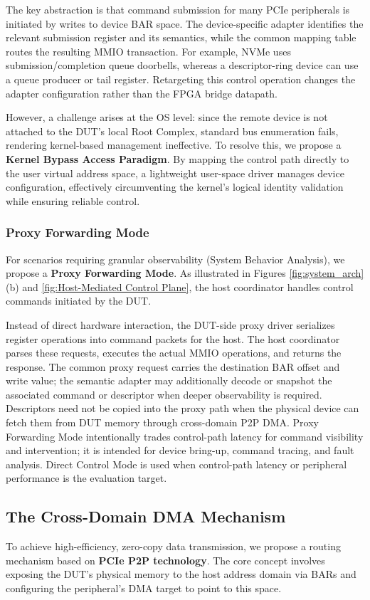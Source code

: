 \documentclass[10pt,conference,letterpaper]{IEEEtran}
\begin{document}
The key abstraction is that command submission for many PCIe peripherals is initiated by writes to device BAR space. The device-specific adapter identifies the relevant submission register and its semantics, while the common mapping table routes the resulting MMIO transaction. For example, NVMe uses submission/completion queue doorbells, whereas a descriptor-ring device can use a queue producer or tail register. Retargeting this control operation changes the adapter configuration rather than the FPGA bridge datapath.

However, a challenge arises at the OS level: since the remote device is not attached to the DUT's local Root Complex, standard bus enumeration fails, rendering kernel-based management ineffective. To resolve this, we propose a \textbf{Kernel Bypass Access Paradigm}. By mapping the control path directly to the user virtual address space, a lightweight user-space driver manages device configuration, effectively circumventing the kernel's logical identity validation while ensuring reliable control.

\subsubsection{Proxy Forwarding Mode} \label{sec:design_proxy}
For scenarios requiring granular observability (System Behavior Analysis), we propose a \textbf{Proxy Forwarding Mode}. As illustrated in Figures \ref{fig:system_arch}(b) and \ref{fig:Host-Mediated Control Plane}, the host coordinator handles control commands initiated by the DUT.

Instead of direct hardware interaction, the DUT-side proxy driver serializes register operations into command packets for the host. The host coordinator parses these requests, executes the actual MMIO operations, and returns the response. The common proxy request carries the destination BAR offset and write value; the semantic adapter may additionally decode or snapshot the associated command or descriptor when deeper observability is required. Descriptors need not be copied into the proxy path when the physical device can fetch them from DUT memory through cross-domain P2P DMA. Proxy Forwarding Mode intentionally trades control-path latency for command visibility and intervention; it is intended for device bring-up, command tracing, and fault analysis. Direct Control Mode is used when control-path latency or peripheral performance is the evaluation target.

\subsection{The Cross-Domain DMA Mechanism} \label{sec:design_data}
To achieve high-efficiency, zero-copy data transmission, we propose a routing mechanism based on \textbf{PCIe P2P technology}. The core concept involves exposing the DUT's physical memory to the host address domain via BARs and configuring the peripheral's DMA target to point to this space.
\end{document}
